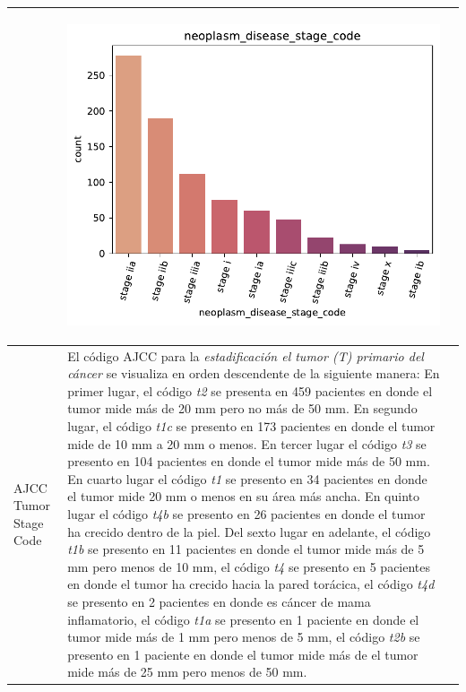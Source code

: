 \begin{table}[!htb]
\begin{threeparttable}
\begin{tabular}{p{2.5cm} p{7cm} p{6.5cm}}
			& \begin{center}\includegraphics[width=1\linewidth]{NOTEBOOK/IMAGENES_DESCRIPTIVAS/4_neoplasm_disease_stage_code}\end{center}
			\\ \hline
			AJCC Tumor Stage Code 
			& El código AJCC para la \textit{estadificación el tumor (T) primario del cáncer} se visualiza en orden descendente de la siguiente manera: En primer lugar, el código \textit{t2} se presenta en 459 pacientes en donde el tumor mide más de 20 mm pero no más de 50 mm. En segundo lugar, el código \textit{t1c} se presento en 173 pacientes en donde el tumor mide  de 10 mm a 20 mm o menos. En tercer lugar el código \textit{t3} se presento en 104 pacientes en donde el tumor mide más de 50 mm. En cuarto lugar el código \textit{t1} se presento en 34 pacientes en donde el tumor  mide 20 mm o menos en su área más ancha. En quinto lugar el código \textit{t4b} se presento en 26 pacientes en donde el tumor ha crecido dentro de la piel. Del sexto lugar en adelante, el código \textit{t1b} se presento en 11 pacientes en donde el tumor mide más de 5 mm pero menos de 10 mm, el código \textit{t4} se presento en 5 pacientes en donde el tumor ha crecido hacia la pared torácica, el código \textit{t4d} se presento en 2 pacientes en donde es cáncer de mama inflamatorio, el código \textit{t1a} se presento en 1 paciente en donde el tumor mide más de 1 mm pero menos de 5 mm, el código \textit{t2b} se presento en 1 paciente en donde el tumor mide más de el tumor mide más de 25 mm pero menos de 50 mm.
			

\end{tabular}
\end{threeparttable}
\end{table}
